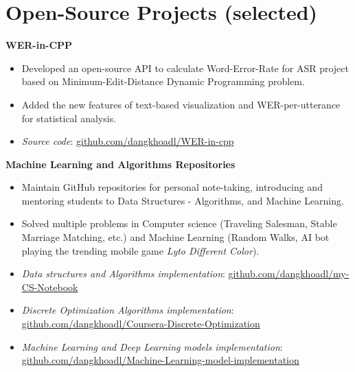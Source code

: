 \documentclass[10pt]{article}
\begin{document}
    \section{Open-Source Projects (selected)}
        \vspace{-2mm}
        \begin{multicols}{1}
            \begin{flushleft}
                \textbf{WER-in-CPP}
            \end{flushleft}
        \end{multicols}
        \vspace{-5mm}
        \begin{itemize}[noitemsep]
            \item Developed an open-source API to calculate Word-Error-Rate for ASR project based on Minimum-Edit-Distance Dynamic Programming problem.
            \item Added the new features of text-based visualization and WER-per-utterance for statistical analysis.
            \item \emph{Source code}: \href{https://github.com/dangkhoadl/WER-in-cpp}{github.com/dangkhoadl/WER-in-cpp}
        \end{itemize}
        \vspace{-2mm}

        \begin{multicols}{1}
            \begin{flushleft}
                \textbf{Machine Learning and Algorithms Repositories}
            \end{flushleft}
        \end{multicols}
        \vspace{-5mm}
        \begin{itemize}[noitemsep]
            \item Maintain GitHub repositories for personal note-taking, introducing and mentoring students to Data Structures - Algorithms, and Machine Learning.
            \item Solved multiple problems in Computer science (Traveling Salesman, Stable Marriage Matching, etc.) and Machine Learning (Random Walks, AI bot playing the trending mobile game \emph{Lyto Different Color}).
            \item \emph{Data structures and Algorithms implementation}: \href{https://github.com/dangkhoadl/my-CS-Notebook}{github.com/dangkhoadl/my-CS-Notebook}
            \item \emph{Discrete Optimization Algorithms implementation}: \href{https://github.com/dangkhoadl/Coursera-Discrete-Optimization}{github.com/dangkhoadl/Coursera-Discrete-Optimization}
            \item \emph{Machine Learning and Deep Learning models implementation}: \href{https://github.com/dangkhoadl/Machine-Learning-model-implementation}{github.com/dangkhoadl/Machine-Learning-model-implementation}
        \end{itemize}
        \vspace{-2mm}
\end{document}
